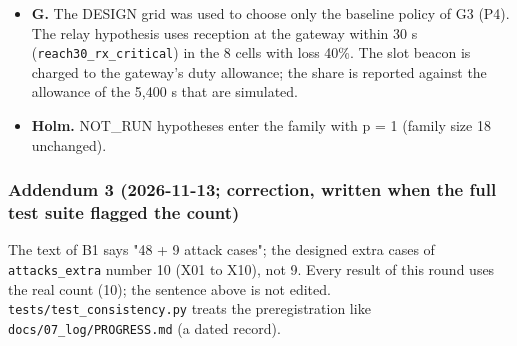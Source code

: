 \begin{itemize}
\item \textbf{G.} The DESIGN grid was used to choose only the baseline policy of G3 (P4). The relay hypothesis uses reception at the gateway within 30 s (\texttt{reach30\_rx\_critical}) in the 8 cells with loss 40\%. The slot beacon is charged to the gateway's duty allowance; the share is reported against the allowance of the 5,400 s that are simulated.
\item \textbf{Holm.} NOT\_RUN hypotheses enter the family with p = 1 (family size 18 unchanged).
\end{itemize}

\subsubsection*{Addendum 3 (2026-11-13; correction, written when the full test suite flagged the count)}
The text of B1 says "48 + 9 attack cases"; the designed extra cases of \texttt{attacks\_extra} number 10 (X01 to X10), not 9. Every result of this round uses the real count (10); the sentence above is not edited. \texttt{tests/test\_consistency.py} treats the preregistration like \texttt{docs/07\_log/PROGRESS.md} (a dated record).

